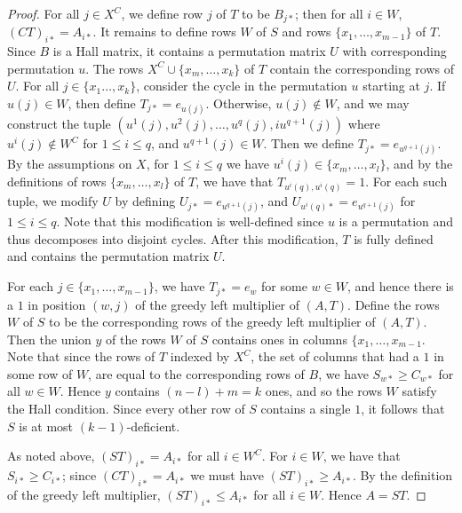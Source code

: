 \documentclass[11pt]{article}
\numberwithin{equation}{section}
\begin{document}
\begin{proof}
  For all $j \in X^C$, we define row $j$ of $T$ to
  be $B_{j*}$; then for all $i \in W$, $(CT)_{i*} = A_{i*}$. It remains to
  define rows $W$ of $S$ and rows $\{x_1, \ldots, x_{m - 1}\}$ of $T$. Since
  $B$ is a Hall matrix, it contains a permutation matrix $U$ with corresponding
  permutation $u$. The rows $X^C
  \cup \{x_m, \ldots, x_k\}$ of $T$ contain the corresponding rows of $U$. For
  all $j \in \{x_1 \ldots, x_k\}$, consider the cycle in the permutation $u$
  starting at $j$. If $u(j) \in W$, then define $T_{j*} = e_{u(j)}$. Otherwise,
  $u(j) \not\in W$, and we may construct the tuple $(u^1(j), u^2(j), \ldots,
  u^{q}(j), iu^{q+1}(j))$ where $u^{i}(j) \not\in W^C$ for $1 \leq i \leq q$,
  and $u^{q + 1}(j) \in W$. Then we define $T_{j*} = e_{u^{q + 1}(j)}$. By the
  assumptions on $X$, for $1 \leq i \leq q$ we have $u^{i}(j) \in \{x_m, \ldots,
    x_l\}$, and by the definitions of rows $\{x_m, \ldots, x_l\}$ of $T$, we
  have that $T_{u^{i}(q),u^{i}(q)} = 1$. For each such tuple, we modify $U$ by
  defining $U_{j*} = e_{u^{q + 1}(j)}$, and $U_{u^{i}(q)*} = e_{u^{q + 1}(j)}$
  for $1 \leq i \leq q$. Note that this modification is well-defined since $u$
  is a permutation and thus decomposes into disjoint cycles. After this
  modification, $T$ is fully defined and contains the permutation matrix $U$.

  For each $j \in \{x_1, \ldots, x_{m - 1}\}$, we have $T_{j*} = e_w$ for some
  $w \in W$, and hence there is a $1$ in position $(w, j)$ of the greedy left
  multiplier of $(A, T)$. Define the rows $W$ of $S$ to be the corresponding
  rows of the greedy left multiplier of $(A, T)$. Then the union $y$ of the rows
  $W$ of $S$ contains ones in columns $\{x_1, \ldots, x_{m - 1}$. Note that
    since the rows of $T$ indexed by $X^C$, the set of columns that had a $1$ in
    some row of $W$, are equal to the corresponding rows of $B$, we have $S_{w*}
    \geq C_{w*}$ for all $w \in W$. Hence $y$ contains $(n - l) + m = k$ ones,
    and so the rows $W$ satisfy the Hall condition. Since every other row of $S$
    contains a single $1$, it follows that $S$ is at most $(k - 1)$-deficient.

  As noted above, $(ST)_{i*} = A_{i*}$ for all $i \in W^C$. For $i \in W$, we
  have that $S_{i*} \geq C_{i*}$; since $(CT)_{i*} = A_{i*}$ we must have
  $(ST)_{i*} \geq A_{i*}$. By the definition of the greedy left multiplier,
  $(ST)_{i*} \leq A_{i*}$ for all $i \in W$. Hence $A = ST$.
    

\end{proof}
\end{document}
